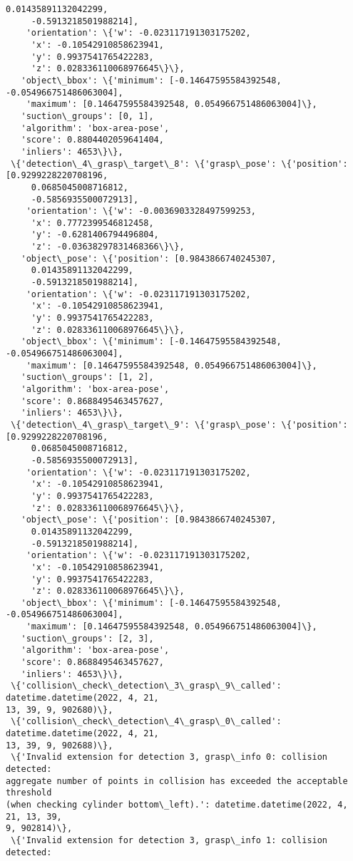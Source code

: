\documentclass[11pt]{article}
\begin{document}
\begin{tcolorbox}[breakable, size=fbox, boxrule=.5pt, pad at break*=1mm, opacityfill=0]
\begin{Verbatim}[commandchars=\\\{\}]
     0.01435891132042299,
     -0.5913218501988214],
    'orientation': \{'w': -0.023117191303175202,
     'x': -0.10542910858623941,
     'y': 0.9937541765422283,
     'z': 0.028336110068976645\}\},
   'object\_bbox': \{'minimum': [-0.14647595584392548, -0.054966751486063004],
    'maximum': [0.14647595584392548, 0.054966751486063004]\},
   'suction\_groups': [0, 1],
   'algorithm': 'box-area-pose',
   'score': 0.8804402059641404,
   'inliers': 4653\}\},
 \{'detection\_4\_grasp\_target\_8': \{'grasp\_pose': \{'position': [0.9299228220708196,
     0.0685045008716812,
     -0.5856935500072913],
    'orientation': \{'w': -0.0036903328497599253,
     'x': 0.7772399546812458,
     'y': -0.6281406794496804,
     'z': -0.03638297831468366\}\},
   'object\_pose': \{'position': [0.9843866740245307,
     0.01435891132042299,
     -0.5913218501988214],
    'orientation': \{'w': -0.023117191303175202,
     'x': -0.10542910858623941,
     'y': 0.9937541765422283,
     'z': 0.028336110068976645\}\},
   'object\_bbox': \{'minimum': [-0.14647595584392548, -0.054966751486063004],
    'maximum': [0.14647595584392548, 0.054966751486063004]\},
   'suction\_groups': [1, 2],
   'algorithm': 'box-area-pose',
   'score': 0.8688495463457627,
   'inliers': 4653\}\},
 \{'detection\_4\_grasp\_target\_9': \{'grasp\_pose': \{'position': [0.9299228220708196,
     0.0685045008716812,
     -0.5856935500072913],
    'orientation': \{'w': -0.023117191303175202,
     'x': -0.10542910858623941,
     'y': 0.9937541765422283,
     'z': 0.028336110068976645\}\},
   'object\_pose': \{'position': [0.9843866740245307,
     0.01435891132042299,
     -0.5913218501988214],
    'orientation': \{'w': -0.023117191303175202,
     'x': -0.10542910858623941,
     'y': 0.9937541765422283,
     'z': 0.028336110068976645\}\},
   'object\_bbox': \{'minimum': [-0.14647595584392548, -0.054966751486063004],
    'maximum': [0.14647595584392548, 0.054966751486063004]\},
   'suction\_groups': [2, 3],
   'algorithm': 'box-area-pose',
   'score': 0.8688495463457627,
   'inliers': 4653\}\},
 \{'collision\_check\_detection\_3\_grasp\_9\_called': datetime.datetime(2022, 4, 21,
13, 39, 9, 902680)\},
 \{'collision\_check\_detection\_4\_grasp\_0\_called': datetime.datetime(2022, 4, 21,
13, 39, 9, 902688)\},
 \{'Invalid extension for detection 3, grasp\_info 0: collision detected:
aggregate number of points in collision has exceeded the acceptable threshold
(when checking cylinder bottom\_left).': datetime.datetime(2022, 4, 21, 13, 39,
9, 902814)\},
 \{'Invalid extension for detection 3, grasp\_info 1: collision detected:

\end{Verbatim}
\end{tcolorbox}
\end{document}
